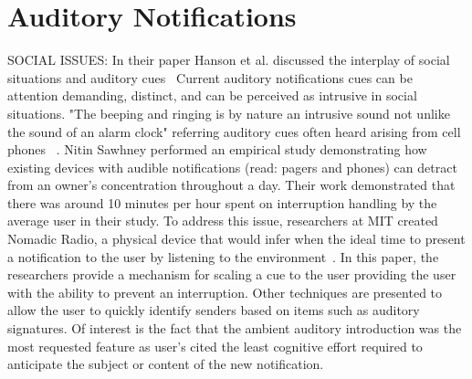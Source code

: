 \section{                  Auditory Notifications                            }

SOCIAL ISSUES: In their paper Hanson et al. discussed the interplay of social
situations and auditory cues~\cite{hansson2001subtle} Current auditory
notifications cues can be attention demanding, distinct, and can be perceived as
intrusive in social situations. "The beeping and ringing is by nature an
intrusive sound not unlike the sound of an alarm clock" referring auditory cues
often heard arising from cell phones  ~\cite{hansson2001subtle}.  Nitin Sawhney
performed an empirical study demonstrating how existing devices with audible
notifications (read: pagers and phones) can detract from an owner's
concentration throughout a day.  Their work demonstrated that there was around
10 minutes per hour spent on  interruption handling by the average user in their study.
To address this issue, researchers at MIT created Nomadic Radio, a physical
device that would infer when the ideal time to present a notification to the
user by listening to the environment~\cite{sawhney1999nomadic}. In this paper,
the researchers provide a mechanism for scaling a cue to the user providing
the user with the ability to prevent an interruption. Other techniques are
presented to allow the user to quickly identify senders based on items such as
auditory signatures.  Of interest is the fact that the ambient auditory
introduction was the most requested feature as user's cited the least cognitive
effort required to anticipate the subject or content of the new notification.
